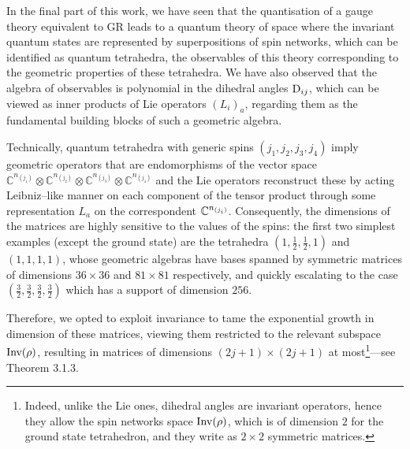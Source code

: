 
In the final part of this work, we have seen that the quantisation of a gauge theory equivalent to GR leads to a quantum theory of space where the invariant quantum states are represented by superpositions of spin networks, which can be identified as quantum tetrahedra, the observables of this theory corresponding to the geometric properties of these tetrahedra. We have also observed that the algebra of observables is polynomial in the dihedral angles $\text{\normalfont D}_{ij}$, which can be viewed as inner products of Lie operators $(L_i)_a$, regarding them as the fundamental building blocks of such a geometric algebra.

Technically, quantum tetrahedra with generic spins \((j_1, j_2, j_3, j_4)\) imply geometric operators that are endomorphisms of the vector space \(\mathbb{C}^{n_{(j_1)}} \otimes \mathbb{C}^{n_{(j_2)}} \otimes \mathbb{C}^{n_{(j_3)}} \otimes \mathbb{C}^{n_{(j_4)}}\) and the Lie operators reconstruct these by acting Leibniz--like manner on each component of the tensor product through some representation $L_a$ on the correspondent $\mathbb{C}^{n_{(j_i)}}$. Consequently, the dimensions of the matrices are highly sensitive to the values of the spins: the first two simplest examples (except the ground state) are the tetrahedra \((1, \frac{1}{2}, \frac{1}{2}, 1)\) and \((1, 1, 1, 1)\), whose geometric algebras have bases spanned by symmetric matrices of dimensions \(36 \times 36\) and \(81 \times 81\) respectively, and quickly escalating to the case \((\frac{3}{2},\frac{3}{2},\frac{3}{2},\frac{3}{2})\) which has a support of dimension $256$.

Therefore, we opted to exploit invariance to tame the exponential growth in dimension of these matrices, viewing them restricted to the relevant subspace $\text{\normalfont Inv}(\rho)$, resulting in matrices of dimensions \((2j+1) \times (2j+1)\) at most\footnote{Indeed, unlike the Lie ones, dihedral angles are invariant operators, hence they allow the spin networks space $\text{\normalfont Inv}(\rho)$, which is of dimension $2$ for the ground state tetrahedron, and they write as $2\times2$ symmetric matrices.}---see Theorem 3.1.3.\\

